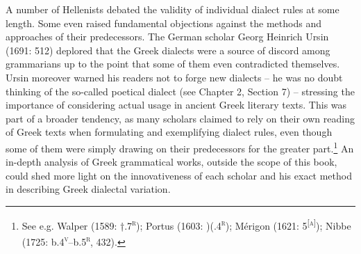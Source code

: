 \begin{styleStandard}
A number of Hellenists debated the validity of individual dialect rules at some length. Some even raised fundamental objections against the methods and approaches of their predecessors. The German scholar Georg Heinrich Ursin (1691: 512) deplored that the Greek dialects were a source of discord among grammarians up to the point that some of them even contradicted themselves. Ursin moreover warned his readers not to forge new dialects – he was no doubt thinking of the so-called poetical dialect (see Chapter 2, Section 7) – stressing the importance of considering actual usage in ancient Greek literary texts. This was part of a broader tendency, as many scholars claimed to rely on their own reading of Greek texts when formulating and exemplifying dialect rules, even though some of them were simply drawing on their predecessors for the greater part.\footnote{\textrm{ See e.g. Walper (1589: †.7}\textrm{\textsc{\textsuperscript{r}}}\textrm{); Portus (1603: )(.4}\textrm{\textsc{\textsuperscript{r}}}\textrm{); Mérigon (1621: 5}\textrm{\textsc{\textsuperscript{[a]}}}\textrm{); Nibbe (1725: b.4}\textrm{\textsc{\textsuperscript{v}}}\textrm{–b.5}\textrm{\textsc{\textsuperscript{r}}}\textrm{, 432).}} An in-depth analysis of Greek grammatical works, outside the scope of this book, could shed more light on the innovativeness of each scholar and his exact method in describing Greek dialectal variation.
\end{styleStandard}

